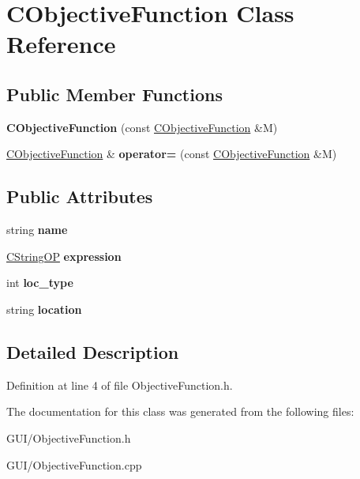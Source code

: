 \hypertarget{class_c_objective_function}{}\section{C\+Objective\+Function Class Reference}
\label{class_c_objective_function}
\subsection*{Public Member Functions}
\begin{DoxyCompactItemize}
\item 
\mbox{\label{class_c_objective_function_af61364a98df43c69e8ac4188d83a56f8}} 
{\bfseries C\+Objective\+Function} (const \hyperlink{class_c_objective_function}{C\+Objective\+Function} \&M)
\item 
\mbox{\label{class_c_objective_function_af4a0727a8396a3473b3a0bb24c20f931}} 
\hyperlink{class_c_objective_function}{C\+Objective\+Function} \& {\bfseries operator=} (const \hyperlink{class_c_objective_function}{C\+Objective\+Function} \&M)
\end{DoxyCompactItemize}
\subsection*{Public Attributes}
\begin{DoxyCompactItemize}
\item 
\mbox{\label{class_c_objective_function_a9aba897f7868a4dfd9aea31a861d484d}} 
string {\bfseries name}
\item 
\mbox{\label{class_c_objective_function_aad8aa9023601ac94c1916fdd236b9033}} 
\hyperlink{class_c_string_o_p}{C\+String\+OP} {\bfseries expression}
\item 
\mbox{\label{class_c_objective_function_a691a69ed75db3d45345043c34f5396b6}} 
int {\bfseries loc\+\_\+type}
\item 
\mbox{\label{class_c_objective_function_a8568dee37ab20ef99bda52d9a661aa76}} 
string {\bfseries location}
\end{DoxyCompactItemize}


\subsection{Detailed Description}


Definition at line 4 of file Objective\+Function.\+h.



The documentation for this class was generated from the following files\+:\begin{DoxyCompactItemize}
\item 
G\+U\+I/Objective\+Function.\+h\item 
G\+U\+I/Objective\+Function.\+cpp\end{DoxyCompactItemize}
